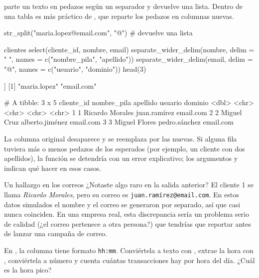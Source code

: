  parte un texto en pedazos según un separador y
devuelve una lista. Dentro de una tabla es más práctico
 de , que reparte los
pedazos en columnas nuevas.

\begin{rcode}
str_split("maria.lopez@email.com", "@")     # devuelve una lista

clientes %
  select(cliente_id, nombre, email) %
  separate_wider_delim(nombre, delim = " ",
                       names = c("nombre_pila", "apellido")) %
  separate_wider_delim(email, delim = "@",
                       names = c("usuario", "dominio")) %
  head(3)
\end{rcode}
\begin{rsalida}
[[1]]
[1] "maria.lopez" "email.com"  

# A tibble: 3 x 5
  cliente_id nombre_pila apellido usuario         dominio  
       <dbl> <chr>       <chr>    <chr>           <chr>    
1          1 Ricardo     Morales  juan.ramírez    email.com
2          2 Miguel      Cruz     alberto.jiménez email.com
3          3 Miguel      Flores   pedro.sánchez   email.com
\end{rsalida}

La columna original desaparece y se reemplaza por las nuevas. Si alguna fila
tuviera más o menos pedazos de los esperados (por ejemplo, un cliente con
dos apellidos), la función se detendría con un error explicativo; los
argumentos  y 
indican qué hacer en esos casos.

\begin{negocio}{Un hallazgo en los correos}
¿Notaste algo raro en la salida anterior? El cliente 1 se llama
\emph{Ricardo Morales}, pero su correo es \texttt{juan.ramírez@email.com}.
En estos datos simulados el nombre y el correo se generaron por separado,
así que casi nunca coinciden. En una empresa real, esta discrepancia sería un
problema serio de calidad (¿el correo pertenece a otra persona?) que
tendrías que reportar antes de lanzar una campaña de correo.
\end{negocio}

\begin{hazlotu}
En , la columna  tiene formato
\texttt{hh:mm}. Conviértela a texto con , extrae la
hora con , conviértela a número y cuenta
cuántas transacciones hay por hora del día. ¿Cuál es la hora pico?
\end{hazlotu}

